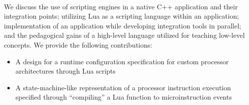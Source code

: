 \paragraph{} We discuss the use of scripting engines in a native C++ application and their integration points; utilizing Lua as a scripting language within an application; implementation of an application while developing integration tools in parallel; and the pedagogical gains of a high-level language utilized for teaching low-level concepts. We provide the following contributions:
\begin{itemize}
    \item A design for a runtime configuration specification for custom processor architectures through Lua scripts
    \item A state-machine-like representation of a processor instruction execution specified through ``compiling'' a Lua function to microinstruction events
\end{itemize}
